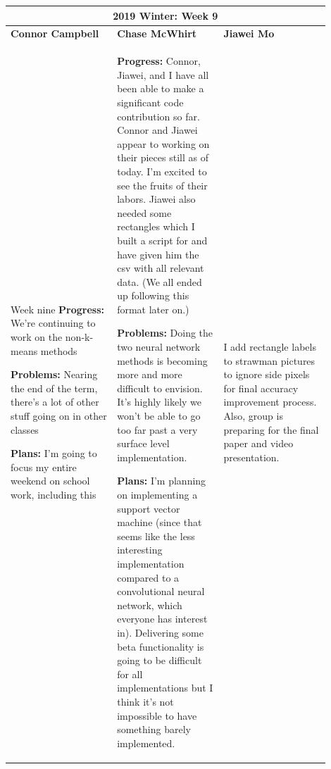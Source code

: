 \documentclass[10pt,journal,compsoc, draftclsnofoot,onecolumn]{IEEEtran}
\begin{document}
\begin{center}
\begin{tabular}{|p{0.3\linewidth}|p{0.3\linewidth}|p{0.3\linewidth}|}
\hline
\multicolumn{3}{|c|}{\textbf{2019 Winter: Week 9}} \\
\hline
\textbf{Connor Campbell} & \textbf{Chase McWhirt} & \textbf{Jiawei Mo} \\ [0.5ex]
\hline\hline

Week nine 
\textbf{Progress:} We're continuing to work on the non-k-means methods

\textbf{Problems:} Nearing the end of the term, there's a lot of other stuff going on in other classes

\textbf{Plans:} I'm going to focus my entire weekend on school work, including this
&
\textbf{Progress:} Connor, Jiawei, and I have all been able to make a significant code contribution so far.
Connor and Jiawei appear to working on their pieces still as of today.
I'm excited to see the fruits of their labors.
Jiawei also needed some rectangles which I built a script for and have given him the csv with all relevant data.
(We all ended up following this format later on.)

\textbf{Problems:} Doing the two neural network methods is becoming more and more difficult to envision.
It's highly likely we won't be able to go too far past a very surface level implementation.

\textbf{Plans:} I'm planning on implementing a support vector machine (since that seems like the less interesting implementation compared to a convolutional neural network, which everyone has interest in).
Delivering some beta functionality is going to be difficult for all implementations but I think it's not impossible to have something barely implemented.
&
I add rectangle labels to strawman pictures to ignore side pixels for final accuracy improvement process. Also, group is preparing for the final paper and video presentation.
\\ \hline
\end{tabular}
\end{center}
\end{document}
